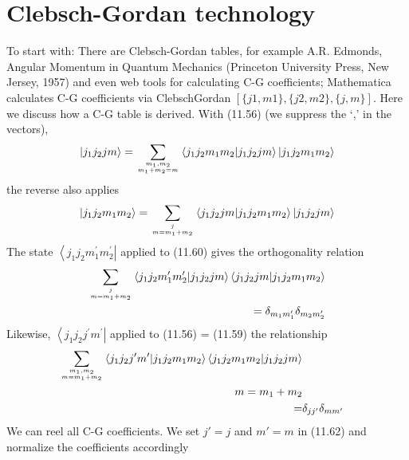\section{Clebsch-Gordan technology}
To start with: There are Clebsch-Gordan tables, for example A.R. Edmonds, Angular Momentum in Quantum Mechanics (Princeton University Press, New Jersey, 1957) and even web tools for calculating C-G coefficients; Mathematica calculates C-G coefficients via ClebschGordan $[\{j 1, m 1\},\{j 2, m 2\},\{j, m\}]$. Here we discuss how a C-G table is derived. With (11.56) (we suppress the `,' in the vectors),
\begin{equation}
    \left|j_{1} j_{2} j m\right\rangle=\sum_{m_{1}, m_{2} \atop m_{1}+m_{2}=m}\left\langle j_{1} j_{2} m_{1} m_{2} | j_{1} j_{2} j m\right\rangle\left|j_{1} j_{2} m_{1} m_{2}\right\rangle
    \end{equation}
the reverse also applies
\begin{equation}
    \left|j_{1} j_{2} m_{1} m_{2}\right\rangle=\sum_{j \atop m=m_{1}+m_{2}}\left\langle j_{1} j_{2} j m | j_{1} j_{2} m_{1} m_{2}\right\rangle\left|j_{1} j_{2} j m\right\rangle
    \end{equation}
The state $\left\langle j_{1} j_{2} m_{1}^{\prime} m_{2}^{\prime}\right|$ applied to (11.60) gives the orthogonality relation
\begin{equation}
\begin{aligned} \sum_{j \atop m=m_{1}+m_{2}}\left\langle j_{1} j_{2} m_{1}^{\prime} m_{2}^{\prime} | j_{1} j_{2} j m\right\rangle\left\langle j_{1} j_{2} j m | j_{1} j_{2} m_{1} m_{2}\right\rangle \\=\delta_{m_{1} m_{1}^{\prime}} \delta_{m_{2} m_{2}^{\prime}} \end{aligned}
\end{equation}
Likewise, $\left\langle j_{1} j_{2} j^{\prime} m^{\prime}\right|$ applied to (11.56) = (11.59) the relationship
\begin{equation}
\begin{aligned} \sum_{m_{1}, m_{2} \atop m=m_{1}+m_{2}}\left\langle j_{1} j_{2} j^{\prime} m^{\prime} | j_{1} j_{2} m_{1} m_{2}\right\rangle\left\langle j_{1} j_{2} m_{1} m_{2} | j_{1} j_{2} j m\right\rangle \\ m=m_{1}+m_{2} \\=& \delta_{j j^{\prime}} \delta_{m m^{\prime}} \end{aligned}
\end{equation}
We can reel all C-G coefficients. We set $j' = j$ and $m' = m$ in (11.62) and normalize the coefficients accordingly

